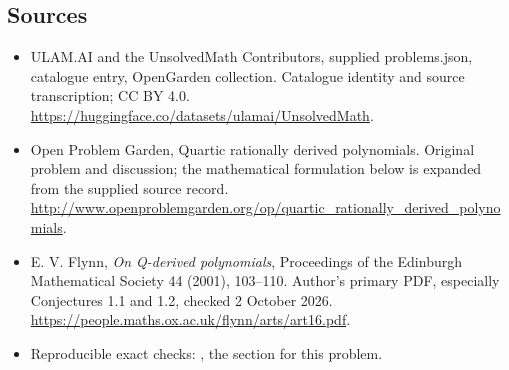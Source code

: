 \documentclass[11pt,a4paper]{article}
\begin{document}
\subsection{Sources}
\begin{itemize}
\item[S1] ULAM.AI and the UnsolvedMath Contributors, supplied problems.json, catalogue entry, OpenGarden collection. Catalogue identity and source transcription; CC BY 4.0.
\url{https://huggingface.co/datasets/ulamai/UnsolvedMath}.
\item[S2] Open Problem Garden, Quartic rationally derived polynomials. Original problem and discussion; the mathematical formulation below is expanded from the supplied source record.
\url{http://www.openproblemgarden.org/op/quartic_rationally_derived_polynomials}.

\item[R1] E. V. Flynn, \emph{On Q-derived polynomials}, Proceedings of
the Edinburgh Mathematical Society 44 (2001), 103--110. Author's
primary PDF, especially Conjectures 1.1 and 1.2, checked 2 October 2026.
\url{https://people.maths.ox.ac.uk/flynn/arts/art16.pdf}.
\item[R2] Reproducible exact checks:
, the section for this problem.

\end{itemize}
\end{document}

